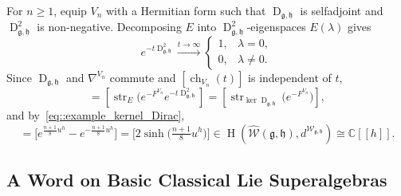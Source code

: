 \documentclass[11pt]{amsart}
\newcommand{\str}{\operatorname{str}}
\newcommand{\Ker}{\operatorname{ker}}
\newcommand{\Dirac}{\operatorname{D}}
\def\WW{{\mathcal{W}}}
\def\CC{{\mathbb C}}
\def\hh{{\mathfrak h}}
\def\H{{\operatorname{H}}}
\def\gg{{\mathfrak{g}}}
\theoremstyle{plain}
\theoremstyle{remark}
\theoremstyle{definition}
\numberwithin{equation}{section}
\theoremstyle{remark}
\begin{document}
For $n\ge1$, equip $V_{n}$ with a Hermitian form such that
$\Dirac_{\gg,\hh}$ is selfadjoint and
$\Dirac_{\gg,\hh}^{2}$ is non-negative. Decomposing $E$ into
$\Dirac_{\gg,\hh}^{2}$-eigenspaces $E(\lambda)$ gives
\begin{equation}
e^{-t\Dirac_{\gg,\hh}^{2}}\xrightarrow{t\to\infty}
\begin{cases}
1,&\lambda=0,\\
0,&\lambda\ne0.
\end{cases}
\end{equation}
Since $\Dirac_{\gg,\hh}$ and $\nabla^{V_{n}}$ commute and $[\operatorname{ch}_{V_{n}}(t)]$ is independent of $t$,
\begin{equation}
[\operatorname{ch}_{V_{n}}(t)]
=[ \str_{E}(e^{-F^{V_{n}}}e^{-t\Dirac_{\gg,\hh}^{2}}]=[\str_{\Ker\Dirac_{\gg,\hh}}
\bigl(e^{-F^{V_{n}}}\bigr)],
\end{equation}
and by~\eqref{eq::example_kernel_Dirac},
\begin{equation}
[\operatorname{ch}_{V_{n}}(t)]
=\bigl[e^{\tfrac{n+1}{8}u^{h}}-e^{-\tfrac{n+1}{8}u^{h}}\bigr]
=\bigl[2\sinh\!\bigl(\tfrac{n+1}{8}u^{h}\bigr)\bigr]
\in\H(\widehat{\WW}(\gg,\hh),d^{\WW_{\gg,\hh}})
\cong\CC[[h]].
\end{equation}


\subsection{A Word on Basic Classical Lie Superalgebras}
\end{document}
